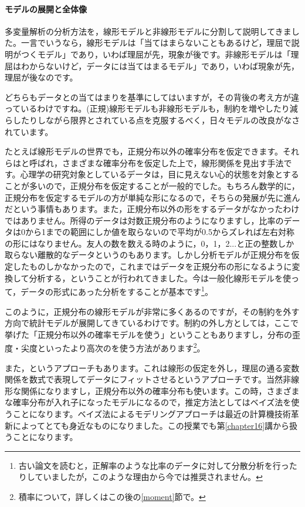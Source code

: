 \documentclass{ltjsbook}
\begin{document}
\paragraph{モデルの展開と全体像}

多変量解析の分析方法を，線形モデルと非線形モデルに分割して説明してきました。一言でいうなら，線形モデルは「当てはまらないこともあるけど，理屈で説明がつくモデル」であり，いわば理屈が先，現象が後です。非線形モデルは「理屈はわからないけど，データには当てはまるモデル」であり，いわば現象が先，理屈が後なのです。

どちらもデータとの当てはまりを基準にしてはいますが，その背後の考え方が違っているわけですね。(正規)線形モデルも非線形モデルも，制約を増やしたり減らしたりしながら限界とされている点を克服するべく，日々モデルの改良がなされています。

たとえば線形モデルの世界でも，正規分布以外の確率分布を仮定できます。それらはと呼ばれ，さまざまな確率分布を仮定した上で，線形関係を見出す手法です。心理学の研究対象としているデータは，目に見えない心的状態を対象とすることが多いので，正規分布を仮定することが一般的でした。もちろん数学的に，正規分布を仮定するモデルの方が単純な形になるので，そちらの発展が先に進んだという事情もあります。また，正規分布以外の形をするデータがなかったわけではありません。所得のデータは対数正規分布のようになりますし，比率のデータは0から1までの範囲にしか値を取らないので平均が0.5からズレれば左右対称の形にはなりません。友人の数を数える時のように，0，1，2...と正の整数しか取らない離散的なデータというのもあります。しかし分析モデルが正規分布を仮定したものしかなかったので，これまではデータを正規分布の形になるように変換して分析する，ということが行われてきました。今は一般化線形モデルを使って，データの形式にあった分析をすることが基本です\footnote{古い論文を読むと，正解率のような比率のデータに対して分散分析を行ったりしていましたが，このような理由から今では推奨されません。}。

このように，正規分布の線形モデルが非常に多くあるのですが，その制約を外す方向で統計モデルが展開してきているわけです。制約の外し方としては，ここで挙げた「正規分布以外の確率モデルを使う」ということもありますし，分布の歪度・尖度といったより高次のを使う方法があります\footnote{積率について，詳しくはこの後の\ref{moment}節で。}。

また，というアプローチもあります。これは線形の仮定を外し，理屈の通る変数関係を数式で表現してデータにフィットさせるというアプローチです。当然非線形な関係になりますし，正規分布以外の確率分布も使います。この時，さまざまな確率分布が入れ子になったモデルになるので，推定方法としてはベイズ法を使うことになります。ベイズ法によるモデリングアプローチは最近の計算機技術革新によってとても身近なものになりました。この授業でも第\ref{chapter16}講から扱うことになります。
\end{document}
